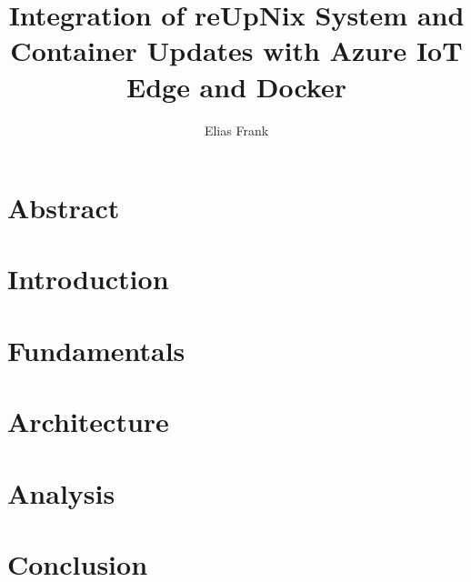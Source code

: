 \documentclass[twoside,privacy]{textmf-local/srathesis}
\author{Elias Frank}
\title{Integration of reUpNix System and Container Updates with Azure IoT Edge and Docker}
\begin{document}
\pagestyle{fancy}

\maketitle

\chapter*{Abstract}

\acresetall

\cleardoublepage
\tableofcontents

\cleardoublepage
{}


\chapter{Introduction}


\chapter{Fundamentals}


\chapter{Architecture}

\chapter{Analysis}

\chapter{Conclusion}


\cleardoublepage

\pagestyle{fancy-lists}


%
\chaptermark{\listoftitlename}

%
\sectionmark{\glossarytitlename}
\chapter*{\glossarytitlename}

\cleardoublepage
\end{document}
